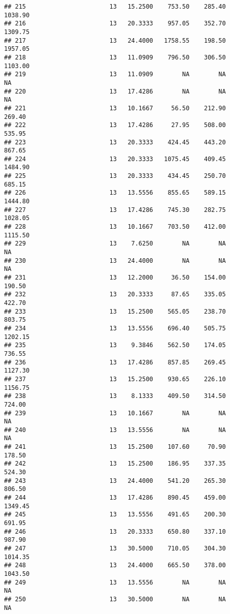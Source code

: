 \documentclass[]{article}
\begin{document}
\begin{verbatim}
## 215                       13   15.2500    753.50    285.40    1038.90
## 216                       13   20.3333    957.05    352.70    1309.75
## 217                       13   24.4000   1758.55    198.50    1957.05
## 218                       13   11.0909    796.50    306.50    1103.00
## 219                       13   11.0909        NA        NA         NA
## 220                       13   17.4286        NA        NA         NA
## 221                       13   10.1667     56.50    212.90     269.40
## 222                       13   17.4286     27.95    508.00     535.95
## 223                       13   20.3333    424.45    443.20     867.65
## 224                       13   20.3333   1075.45    409.45    1484.90
## 225                       13   20.3333    434.45    250.70     685.15
## 226                       13   13.5556    855.65    589.15    1444.80
## 227                       13   17.4286    745.30    282.75    1028.05
## 228                       13   10.1667    703.50    412.00    1115.50
## 229                       13    7.6250        NA        NA         NA
## 230                       13   24.4000        NA        NA         NA
## 231                       13   12.2000     36.50    154.00     190.50
## 232                       13   20.3333     87.65    335.05     422.70
## 233                       13   15.2500    565.05    238.70     803.75
## 234                       13   13.5556    696.40    505.75    1202.15
## 235                       13    9.3846    562.50    174.05     736.55
## 236                       13   17.4286    857.85    269.45    1127.30
## 237                       13   15.2500    930.65    226.10    1156.75
## 238                       13    8.1333    409.50    314.50     724.00
## 239                       13   10.1667        NA        NA         NA
## 240                       13   13.5556        NA        NA         NA
## 241                       13   15.2500    107.60     70.90     178.50
## 242                       13   15.2500    186.95    337.35     524.30
## 243                       13   24.4000    541.20    265.30     806.50
## 244                       13   17.4286    890.45    459.00    1349.45
## 245                       13   13.5556    491.65    200.30     691.95
## 246                       13   20.3333    650.80    337.10     987.90
## 247                       13   30.5000    710.05    304.30    1014.35
## 248                       13   24.4000    665.50    378.00    1043.50
## 249                       13   13.5556        NA        NA         NA
## 250                       13   30.5000        NA        NA         NA

\end{verbatim}
\end{document}
